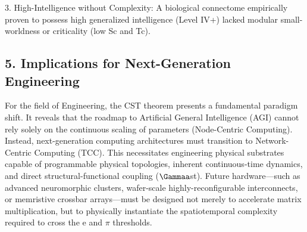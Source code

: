 \documentclass[a4paper,12pt]{article}
\begin{document}
3. High-Intelligence without Complexity: A biological connectome empirically proven to possess high generalized intelligence (Level IV+) lacked modular small-worldness or criticality (low Sc and Tc).



\subsection{5. Implications for Next-Generation Engineering}

For the field of Engineering, the CST theorem presents a fundamental paradigm shift. It reveals that the roadmap to Artificial General Intelligence (AGI) cannot rely solely on the continuous scaling of parameters (Node-Centric Computing). Instead, next-generation computing architectures must transition to Network-Centric Computing (TCC). This necessitates engineering physical substrates capable of programmable physical topologies, inherent continuous-time dynamics, and direct structural-functional coupling ($\Gammaa$st). Future hardware---such as advanced neuromorphic clusters, wafer-scale highly-reconfigurable interconnects, or memristive crossbar arrays---must be designed not merely to accelerate matrix multiplication, but to physically instantiate the spatiotemporal complexity required to cross the e and $\pi$ thresholds.
\end{document}
